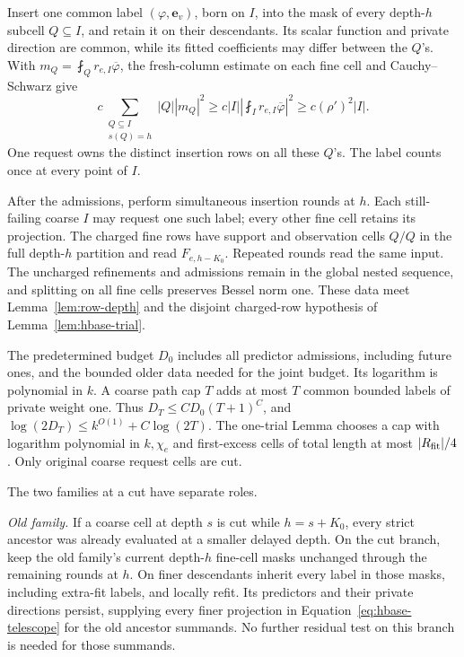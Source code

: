 Insert one common label \((\varphi,\mathbf e_v)\), born on \(I\),
into the mask of every depth-\(h\) subcell \(Q\subseteq I\), and
retain it on their descendants.  Its scalar function and private
direction are common, while its fitted coefficients may differ
between the \(Q\)'s.  With
\(m_Q=\fint_Q r_{e,I}\overline\varphi\), the fresh-column estimate
on each fine cell and Cauchy--Schwarz give
\begin{equation}
 c\sum_{\substack{Q\subseteq I\\s(Q)=h}}|Q||m_Q|^2
 \ge c|I|\left|\fint_I r_{e,I}\overline\varphi\right|^2
 \ge c(\rho')^2|I|.                                           \label{eq:hbase-high-gain}
\end{equation}
One request owns the distinct insertion rows on all these \(Q\)'s.
The label counts once at every point of \(I\).

After the admissions, perform simultaneous insertion rounds at \(h\).
Each still-failing coarse \(I\) may request one such label; every
other fine cell retains its projection.  The charged fine rows
have support and observation cells \(Q/Q\) in the full depth-\(h\)
partition and read \(F_{e,h-K_0}\).  Repeated rounds read the same
input.  The uncharged refinements and admissions remain in the
global nested sequence, and splitting on all fine cells preserves
Bessel norm one.  These data meet Lemma~\ref{lem:row-depth} and
the disjoint charged-row hypothesis of Lemma~\ref{lem:hbase-trial}.

The predetermined budget \(D_0\) includes all predictor admissions,
including future ones, and the bounded older data needed for the
joint budget.  Its logarithm is polynomial in \(k\).
A coarse path cap \(T\) adds at most \(T\) common bounded labels
of private weight one.  Thus \(D_T\le C D_0(T+1)^C\), and
\(\log(2D_T)\le k^{O(1)}+C\log(2T)\).
The one-trial Lemma chooses a cap with logarithm polynomial in
\(k,\chi_e\) and first-excess cells of total length at most
\(|R_{\rm fit}|/4\).  Only original coarse request cells are cut.

The two families at a cut have separate roles.

\emph{Old family.}  If a coarse cell at depth \(s\) is cut while
\(h=s+K_0\), every strict ancestor was already evaluated at a
smaller delayed depth.  On the cut branch, keep the old family's
current depth-\(h\) fine-cell masks unchanged through the remaining
rounds at \(h\).  On finer descendants inherit every label in those
masks, including extra-fit labels, and locally refit.  Its predictors
and their private directions persist, supplying every finer
projection in Equation~\eqref{eq:hbase-telescope} for the old
ancestor summands.  No further residual test on this branch is
needed for those summands.

